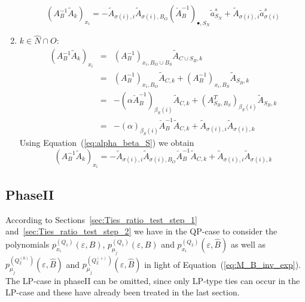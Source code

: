 \documentclass[a4paper]{article}
\newcommand{\pmu}[2]{\ensuremath{p_{\mu_{j}}^{(#1)}(\varepsilon, #2)}}
\begin{document}
\begin{enumerate}
\begin{equation}
(A_{B}^{-1}\tilde{A}_{k})_{x_{i}} =
-\tilde{A}_{\sigma(i), i}\tilde{A}_{\sigma(i), B_{O}}
\left(\check{A}_{B}^{-1}\right)_{\bullet, S_{N}}\tilde{a}_{S_{N}}^{s}
+\tilde{A}_{\sigma(i), i}\tilde{a}_{\sigma(i)}^{s} 
\end{equation}
\item $k \in \hat{N} \cap O$:
\begin{eqnarray}
  (A_{B}^{-1}\tilde{A}_{k})_{x_{i}} &=& 
  (A_{B}^{-1})_{x_{i}, B_{O} \cup B_{S}}\tilde{A}_{C \cup S_{B}, k}
  \nonumber \\
  &=&
  (A_{B}^{-1})_{x_{i}, B_{O}}\tilde{A}_{C, k} +
  (A_{B}^{-1})_{x_{i}, B_{S}}\tilde{A}_{S_{B}, k}
  \nonumber \\
  &=&
  -(\alpha\check{A}_{B}^{-1})_{\beta_{S}(i)}\tilde{A}_{C, k}
  + (A_{S_{B}, B_{S}}^{T})_{\beta_{S}(i)}\tilde{A}_{S_{B}, k}
  \nonumber \\
  &=&
  -\left(\alpha\right)_{\beta_{S}(i)}\check{A}_{B}^{-1}\tilde{A}_{C,k}
  +\tilde{A}_{\sigma(i),i}\tilde{A}_{\sigma(i),k}
  \nonumber
\end{eqnarray}
Using Equation~(\ref{eq:alpha_beta_S}) we obtain
\begin{equation}
  (A_{B}^{-1}\tilde{A}_{k})_{x_{i}} =
  -\tilde{A}_{\sigma(i), i}\tilde{A}_{\sigma(i), B_{O}}
  \check{A}_{B}^{-1}\tilde{A}_{C, k}
  +\tilde{A}_{\sigma(i), i}\tilde{A}_{\sigma(i), k}
\end{equation}
\end{enumerate}

\subsection{PhaseII}
According to Sections~\ref{sec:Ties_ratio_test_step_1}
and~\ref{sec:Ties_ratio_test_step_2} we have in the QP-case
to consider the polynomials $p_{x_{i}}^{(Q_{1})}(\varepsilon, B)$,
\pmu{Q_{1}}{B} and
$p_{x_{i}}^{(Q_{2})}(\varepsilon, \hat{B})$ as well as
\pmu{Q_{2}^{(0)}}{\hat{B}} and \pmu{Q_{2}^{(+)}}{\hat{B}} in light of
Equation~(\ref{eq:M_B_inv_exp}). The LP-case in phaseII can be omitted,
since only LP-type ties can occur in the LP-case
and these have already been treated in the last section. 
\end{document}
